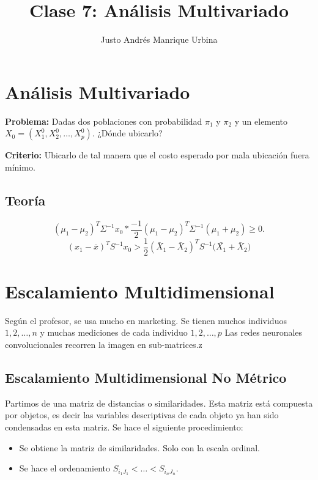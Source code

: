 \documentclass{article}
\title{Clase 7: Análisis Multivariado}
\author{Justo Andrés Manrique Urbina}
\begin{document}
\maketitle

\section{Análisis Multivariado}
\textbf{Problema:} Dadas dos poblaciones con probabilidad $\pi_{1}$ y $\pi_{2}$ y un elemento $X_{0}={(X_{1}^{0},X_{2}^{0},\ldots,X_{p}^{0})}$. ¿Dónde ubicarlo?

\textbf{Criterio:} Ubicarlo de tal manera que el costo esperado por mala ubicación fuera mínimo.

\subsection{Teoría}
\[ {(\mu_{1}-\mu_{2})}^{T}\Sigma^{-1}x_{0}* \frac{-1}{2} {(\mu_{1}-\mu_{2})}^{T}\Sigma^{-1}{(\mu_{1}+\mu_{2})}\geq 0.\]
\[ {(x_{1}-\bar{x})}^{T}S^{-1}x_{0}> \frac{1}{2}{(\bar{X}_{1}-\bar{X}_{2})}^{T}S^{-1}{(\bar{X_{1}}+\bar{X}_{2}})\]

\section{Escalamiento Multidimensional}

Según el profesor, se usa mucho en marketing. Se tienen muchos individuos $1,2,\ldots,n$ y muchas mediciones de cada individuo $1,2,\ldots,p$
Las redes neuronales convolucionales recorren la imagen en sub-matrices.z

\subsection{Escalamiento Multidimensional No Métrico}
Partimos de una matriz de distancias o similaridades. Esta matriz está compuesta por objetos, es decir las variables descriptivas de cada objeto ya han sido condensadas en esta matriz. Se hace el siguiente procedimiento:
\begin{itemize}
	\item Se obtiene la matriz de similaridades. Solo con la escala ordinal.
	\item Se hace el ordenamiento $S_{i_{1}J_{1}}< \ldots < S_{i_{n}J_{n}}$.
\end{itemize}
\end{document}
